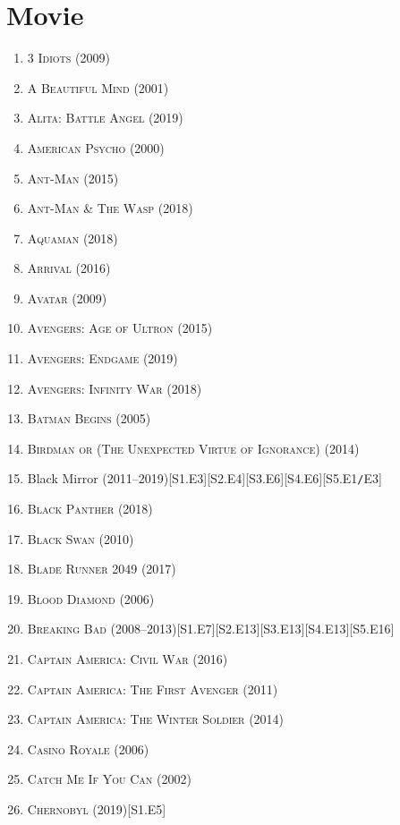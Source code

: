 \documentclass{article}
\begin{document}

\section{Movie}

\begin{enumerate}
	\item \textsc{3 Idiots} (2009)
	\item \textsc{A Beautiful Mind} (2001)
	\item \textsc{Alita: Battle Angel} (2019)
	\item \textsc{American Psycho} (2000)
	\item \textsc{Ant-Man} (2015)
	\item \textsc{Ant-Man \& The Wasp} (2018)
	\item \textsc{Aquaman} (2018)
	\item \textsc{Arrival} (2016)
	\item \textsc{Avatar} (2009)
	\item \textsc{Avengers: Age of Ultron} (2015)
	\item \textsc{Avengers: Endgame} (2019)
	\item \textsc{Avengers: Infinity War} (2018)
	\item \textsc{Batman Begins} (2005)
	\item \textsc{Birdman or (The Unexpected Virtue of Ignorance)} (2014)
	\item Black Mirror (2011--2019)\hfill[S1.E3][S2.E4][S3.E6][S4.E6][S5.E1\texttt{/}E3]
	\item \textsc{Black Panther} (2018)
	\item \textsc{Black Swan} (2010)
	\item \textsc{Blade Runner 2049} (2017)
	\item \textsc{Blood Diamond} (2006)
	\item \textsc{Breaking Bad} (2008--2013)\hfill[S1.E7][S2.E13][S3.E13][S4.E13][S5.E16]
	\item \textsc{Captain America: Civil War} (2016)
	\item \textsc{Captain America: The First Avenger} (2011)
	\item \textsc{Captain America: The Winter Soldier} (2014)
	\item \textsc{Casino Royale} (2006)
	\item \textsc{Catch Me If You Can} (2002)
	\item \textsc{Chernobyl} (2019)\hfill[S1.E5]
	

\end{enumerate}
\end{document}
